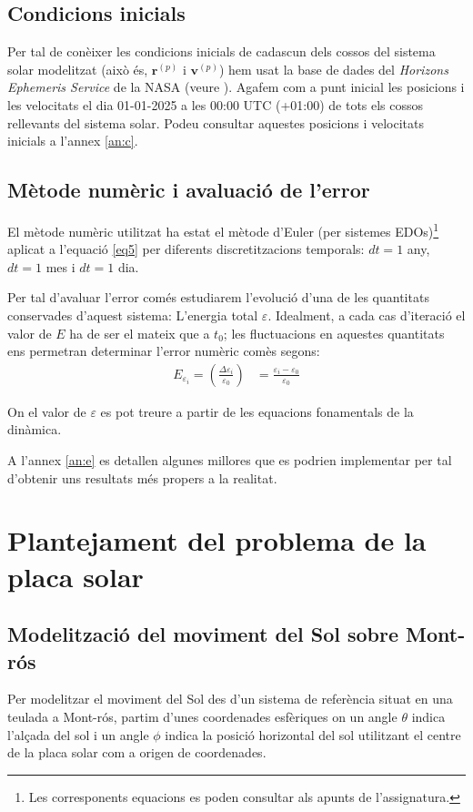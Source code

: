 \documentclass[10pt, twoside, a4paper]{article}
\begin{document}
\subsection{Condicions inicials}
Per tal de conèixer les condicions inicials de cadascun dels cossos del sistema solar modelitzat (això és, $\mathbf{r}^{(p)}$ i $\mathbf{v}^{(p)}$) hem usat la base de dades del \textit{Horizons Ephemeris Service} de la NASA (veure \cite{ref3}). Agafem com a punt inicial les posicions i les velocitats el dia 01-01-2025 a les 00:00 UTC (+01:00) de tots els cossos rellevants del sistema solar. Podeu consultar aquestes posicions i velocitats inicials a l'annex \ref{an:c}.

\subsection{Mètode numèric i avaluació de l'error}
El mètode numèric utilitzat ha estat el mètode d'Euler (per sistemes EDOs)\footnote{Les corresponents equacions es poden consultar als apunts de l'assignatura.} aplicat a l'equació \eqref{eq5} per diferents discretitzacions temporals: $dt = 1$ any, $dt = 1$ mes i $dt = 1$ dia.

Per tal d'avaluar l'error comés estudiarem l'evolució d'una de les quantitats conservades d'aquest sistema: L'energia total $\varepsilon$. Idealment, a cada cas d'iteració el valor de $E$ ha de ser el mateix que a $t_0$; les fluctuacions en aquestes quantitats ens permetran determinar l'error numèric comès segons:
\begin{align}
    E_{\varepsilon_i} = \left( \frac{\Delta \varepsilon_i}{\varepsilon_0} \right) & = \frac{\varepsilon_i - \varepsilon_0}{\varepsilon_0} 
\end{align}

On el valor de $\varepsilon$ es pot treure a partir de les equacions fonamentals de la dinàmica.

A l'annex \ref{an:e} es detallen algunes millores que es podrien implementar per tal d'obtenir uns resultats més propers a la realitat.

\section{Plantejament del problema de la placa solar}

\subsection{Modelització del moviment del Sol sobre Mont-rós}
Per modelitzar el moviment del Sol des d'un sistema de referència situat en una teulada a Mont-rós, partim d'unes coordenades esfèriques on un angle $\theta$ indica l'alçada del sol i un angle $\phi$ indica la posició horizontal del sol utilitzant el centre de la placa solar com a origen de coordenades.
\end{document}
